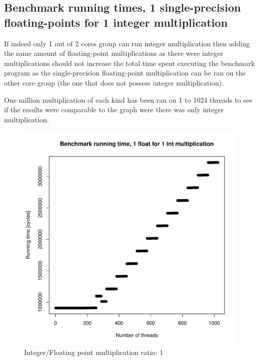 \documentclass{article}
\def \scalingfactor{.8}
\begin{document}
	\subsection{Benchmark running times, 1 single-precision floating-points for 1 integer multiplication}
	If indeed only 1 out of 2 cores group can run integer multiplication then
    adding the same amount of floating-point multiplications as there were integer
    multiplications should not increase the total time spent executing the benchmark 
    program as the single-precision floating-point multiplication can
    be ran on the other core group (the one that does not possess integer multiplication).
	
	One million multiplication of each kind has been ran on 1 to 1024 threads to
    see if the results were comparable to the graph were there was only integer multiplication.
	\begin{figure}[h]
		\centering
		\vspace{-20pt}
    			\includegraphics[width=\scalingfactor\linewidth]{"graphics/running_times_ratio11"}
		\vspace{-15pt}
		\caption{Integer/Floating point multiplication ratio: 1}
	\end{figure}
	\pagebreak
\end{document}
